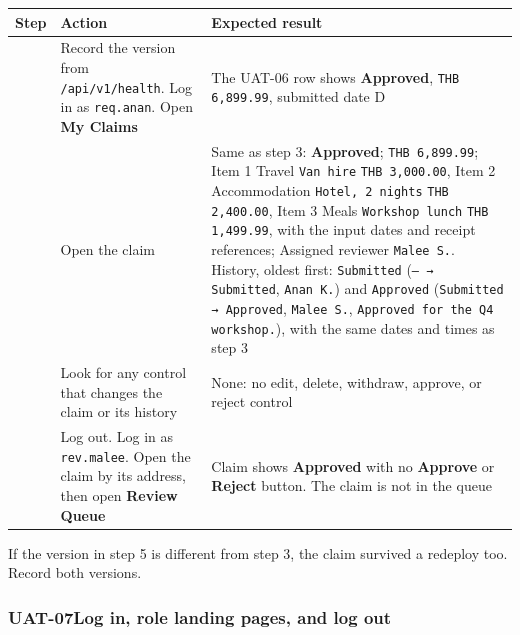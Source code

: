 {\def\LTcaptype{none} %
\begin{longtable}[]{@{}
  >{\raggedright\arraybackslash}p{}
  >{\raggedright\arraybackslash}p{}
  >{\raggedright\arraybackslash}p{}@{}}
\toprule\noalign{}
\begin{minipage}[b]{\linewidth}\raggedright
Step
\end{minipage} & \begin{minipage}[b]{\linewidth}\raggedright
Action
\end{minipage} & \begin{minipage}[b]{\linewidth}\raggedright
Expected result
\end{minipage} \\
\midrule\noalign{}
\endhead
\bottomrule\noalign{}
\endlastfoot
5 & Record the version from \texttt{/api/v1/health}. Log in as \texttt{req.anan}. Open \textbf{My Claims} & The UAT-06 row shows \textbf{Approved}, \texttt{THB 6,899.99}, submitted date D \\
6 & Open the claim \shot{} & Same as step 3: \textbf{Approved}; \texttt{THB 6,899.99}; Item 1 Travel \texttt{Van hire} \texttt{THB 3,000.00}, Item 2 Accommodation \texttt{Hotel, 2 nights} \texttt{THB 2,400.00}, Item 3 Meals \texttt{Workshop lunch} \texttt{THB 1,499.99}, with the input dates and receipt references; Assigned reviewer \texttt{Malee S.}. History, oldest first: \texttt{Submitted} (\texttt{– → Submitted}, \texttt{Anan K.}) and \texttt{Approved} (\texttt{Submitted → Approved}, \texttt{Malee S.}, \texttt{Approved for the Q4 workshop.}), with the same dates and times as step 3 \\
7 & Look for any control that changes the claim or its history & None: no edit, delete, withdraw, approve, or reject control \\
8 & Log out. Log in as \texttt{rev.malee}. Open the claim by its address, then open \textbf{Review Queue} & Claim shows \textbf{Approved} with no \textbf{Approve} or \textbf{Reject} button. The claim is not in the queue \\
\end{longtable}
}

If the version in step 5 is different from step 3, the claim survived a redeploy too. Record both versions.

\subsubsection*{UAT-07\enspace Log in, role landing pages, and log out}\label{case:UAT-07}

